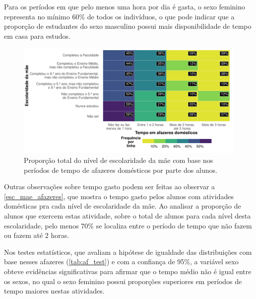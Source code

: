 Para os períodos em que pelo menos uma hora por dia é gasta, o sexo feminino
representa no mínimo 60\% de todos os indivíduos, o que pode indicar que a proporção 
de estudantes do sexo masculino possui mais disponibilidade de tempo em casa para estudos.

\begin{figure}[h]
    \caption{Proporção total do nível de escolaridade da mãe
    com base nos períodos de tempo de afazeres domésticos por parte dos alunos.\label{esc_mae_afazeres}}
    \begin{center}
        \includegraphics[width=16cm]{img/esc_mae_afazeres.pdf}
    \end{center}
\end{figure}

Outras observações sobre tempo gasto podem ser feitas ao observar a \autoref{esc_mae_afazeres},
que mostra o tempo gasto pelos alunos com atividades domésticas pra cada nível de escolaridade da mãe.
Ao analisar a proporção de alunos que exercem estas atividade, sobre o total de alunos para cada nível
desta escolaridade, pelo menos 70\% se localiza entre o período de tempo que 
não fazem ou fazem até 2 horas.

Nos testes estatísticos, que avaliam a hipótese de igualdade das distribuições com base nesses afazeres (\autoref{tab:af_test}) e com a
confiança de 95\%, a variável sexo obteve evidências significativas para afirmar que o tempo
médio não é igual entre os sexos, no qual o sexo feminino possui
proporções superiores em períodos de tempo maiores nestas atividades.

